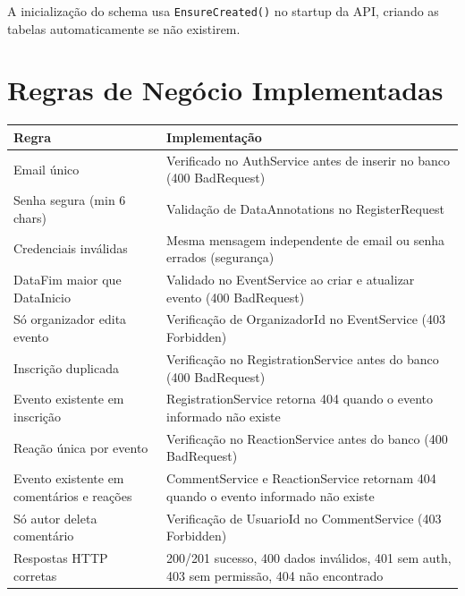 \documentclass[11pt, a4paper, oneside]{article}
\begin{document}
A inicialização do schema usa \texttt{EnsureCreated()} no startup da API, criando as tabelas automaticamente se não existirem.

\section{Regras de Negócio Implementadas}

\begin{longtable}{L{5cm} L{9.5cm}}
\toprule
{}
\color{white}\textbf{Regra} & \color{white}\textbf{Implementação} \\
\midrule
\endhead
Email único & Verificado no AuthService antes de inserir no banco (400 BadRequest) \\
Senha segura (min 6 chars) & Validação de DataAnnotations no RegisterRequest \\
Credenciais inválidas & Mesma mensagem independente de email ou senha errados (segurança) \\
DataFim maior que DataInicio & Validado no EventService ao criar e atualizar evento (400 BadRequest) \\
Só organizador edita evento & Verificação de OrganizadorId no EventService (403 Forbidden) \\
Inscrição duplicada & Verificação no RegistrationService antes do banco (400 BadRequest) \\
Evento existente em inscrição & RegistrationService retorna 404 quando o evento informado não existe \\
Reação única por evento & Verificação no ReactionService antes do banco (400 BadRequest) \\
Evento existente em comentários e reações & CommentService e ReactionService retornam 404 quando o evento informado não existe \\
Só autor deleta comentário & Verificação de UsuarioId no CommentService (403 Forbidden) \\
Respostas HTTP corretas & 200/201 sucesso, 400 dados inválidos, 401 sem auth, 403 sem permissão, 404 não encontrado \\
\bottomrule
\end{longtable}

\end{document}
